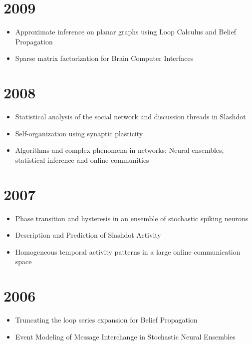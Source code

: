 \documentclass{article}
\begin{document}
\section*{2009}

\begin{itemize}
\item Approximate inference on planar graphs using Loop Calculus and Belief Propagation~\cite{Gomez:2009:AIP:1795114.1795138}
\item Sparse matrix factorization for Brain Computer Interfaces~\cite{5349481}
\end{itemize}

\section*{2008}

\begin{itemize}
\item Statistical analysis of the social network and discussion threads in Slashdot~\cite{gomez08}
\item Self-organization using synaptic plasticity~\cite{NIPS2008_3394}
\item Algorithms and complex phenomena in networks: Neural ensembles, statistical inference and online communities~\cite{gomez2008thesis}
\end{itemize}

\section*{2007}

\begin{itemize}
\item Phase transition and hysteresis in an ensemble of stochastic spiking neurons~\cite{kaltenbrunner2007}
\item Description and Prediction of Slashdot Activity~\cite{kaltenbrunner_LAWEB2007}
\item Homogeneous temporal activity patterns in a large online communication space~\cite{kaltenbrunner_saw2007}
\end{itemize}

\section*{2006}

\begin{itemize}
\item Truncating the loop series expansion for Belief Propagation~\cite{gomez07}
\item Event Modeling of Message Interchange in Stochastic Neural Ensembles~\cite{gomez2006}
\end{itemize}



\newpage


%
%
%
%
%
%
%
%
%
%
%
%
%
%
%

\end{document}
